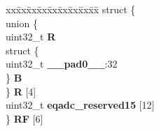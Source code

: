 \begin{DoxyCompactItemize}
\begin{tabbing}
\end{tabbing}\item 
\mbox{\label{structEQADC__tag_a0a13e7833b64a143a602838531b76e49}} 
\begin{tabbing}
xx\=xx\=xx\=xx\=xx\=xx\=xx\=xx\=xx\=\kill
struct \{\\
\>union \{\\
\>\>uint32\_t {\bfseries R}\\
\>\>struct \{\\
\>\>\>uint32\_t {\bfseries \_\_pad0\_\_}:32\\
\>\>\} {\bfseries B}\\
\>\} {\bfseries R} \mbox{[}4\mbox{]}\\
\>uint32\_t {\bfseries eqadc\_reserved15} \mbox{[}12\mbox{]}\\
\} {\bfseries RF} \mbox{[}6\mbox{]}\\


\end{tabbing}
\end{DoxyCompactItemize}
